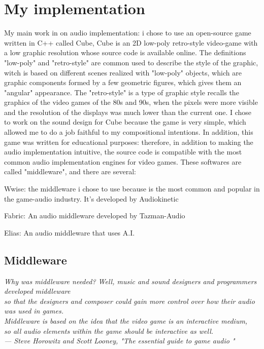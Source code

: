 
\chapter{My implementation}
\label{chp:fundamentals}

My main work in on audio implementation: i chose to use an open-source game written in C++ called Cube,
Cube is an 2D low-poly retro-style video-game with a low graphic resolution whose source code is available online. The definitions "low-poly" and "retro-style" are common used to describe the style of the graphic, witch is based on different scenes realized with "low-poly" objects, which are graphic components formed by a few geometric figures, which gives them an "angular" appearance. The "retro-style" is a type of graphic style recalls the graphics of the video games of the 80s and 90s, when the pixels were more visible and the resolution of the displays was much lower than the current one.
I chose to work on the sound design for Cube because the game is very simple, which allowed me to do a job faithful to my compositional intentions. In addition, this game was written for educational purposes: therefore, in addition to making the audio implementation intuitive, the source code is compatible with the most common audio implementation engines for video games. These softwares are called "middleware", and there are several:

\begin{compactitem}
	\item Wwise: the middleware i chose to use because is the most common and popular in the game-audio industry. It's developed by Audiokinetic
	\item Fabric: An audio middleware developed by Tazman-Audio
	\item Elias: An audio middleware that uses A.I.
\end{compactitem}



\section{Middleware}
\begin{flushright}
	\itshape
	Why was middleware needed? Well, music and sound designers and programmers developed middleware \\
	so that the designers and composer could gain more control over how their audio was used in games.\\
	Middleware is based on the idea that the video game is an interactive medium, \\
	so all audio elements within the game should be interactive as well. \\
	\medskip
	--- Steve Horowitz and Scott Looney, "The essential guide to game audio "
\end{flushright}

